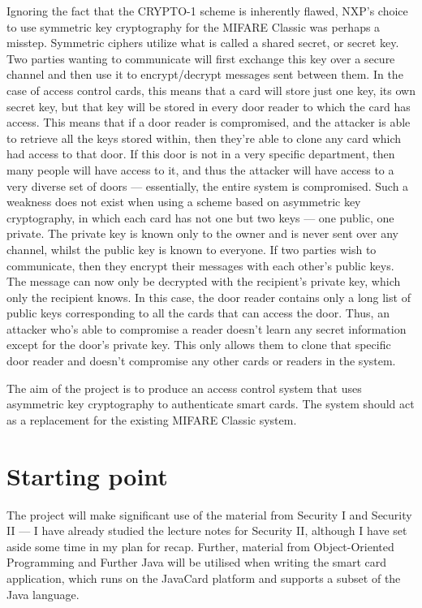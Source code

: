 \documentclass[12pt,a4paper,twoside]{article}
\begin{document}
Ignoring the fact that the CRYPTO-1 scheme is inherently flawed, NXP's choice to use symmetric key cryptography for the MIFARE Classic was perhaps a misstep. Symmetric ciphers utilize what is called a shared secret, or secret key. Two parties wanting to communicate will first exchange this key over a secure channel and then use it to encrypt/decrypt messages sent between them. In the case of access control cards, this means that a card will store just one key, its own secret key, but that key will be stored in every door reader to which the card has access. This means that if a door reader is compromised, and the attacker is able to retrieve all the keys stored within, then they're able to clone any card which had access to that door. If this door is not in a very specific department, then many people will have access to it, and thus the attacker will have access to a very diverse set of doors --- essentially, the entire system is compromised. Such a weakness does not exist when using a scheme based on asymmetric key cryptography, in which each card has not one but two keys --- one public, one private. The private key is known only to the owner and is never sent over any channel, whilst the public key is known to everyone. If two parties wish to communicate, then they encrypt their messages with each other's public keys. The message can now only be decrypted with the recipient's private key, which only the recipient knows. In this case, the door reader contains only a long list of public keys corresponding to all the cards that can access the door. Thus, an attacker who's able to compromise a reader doesn't learn any secret information except for the door's private key. This only allows them to clone that specific door reader and doesn't compromise any other cards or readers in the system.

The aim of the project is to produce an access control system that uses asymmetric key cryptography to authenticate smart cards. The system should act as a replacement for the existing MIFARE Classic system.

\section*{Starting point}

The project will make significant use of the material from Security I and Security II --- I have already studied the lecture notes for Security II, although I have set aside some time in my plan for recap. Further, material from Object-Oriented Programming and Further Java will be utilised when writing the smart card application, which runs on the JavaCard platform and supports a subset of the Java language.
\end{document}
